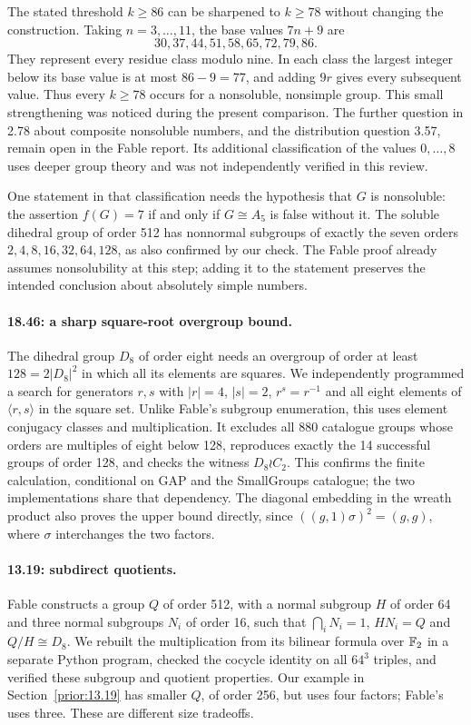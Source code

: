 The stated threshold \(k\ge86\) can be sharpened to \(k\ge78\)
without changing the construction. Taking \(n=3,\ldots,11\), the base
values \(7n+9\) are
\[
30,37,44,51,58,65,72,79,86.
\]
They represent every residue class modulo nine. In each class the
largest integer below its base value is at most \(86-9=77\), and
adding \(9r\) gives every subsequent value. Thus every \(k\ge78\)
occurs for a nonsoluble, nonsimple group. This small strengthening was
noticed during the present comparison. The further question in 2.78
about composite nonsoluble numbers, and the distribution question
3.57, remain open in the Fable report. Its additional classification
of the values \(0,\ldots,8\) uses deeper group theory and was not
independently verified in this review.

One statement in that classification needs the hypothesis that \(G\)
is nonsoluble: the assertion \(f(G)=7\) if and only if \(G\cong A_5\)
is false without it. The soluble dihedral group of order 512 has
nonnormal subgroups of exactly the seven orders
\(2,4,8,16,32,64,128\), as also confirmed by our check.
The Fable proof already assumes nonsolubility at this step; adding
it to the statement preserves the intended conclusion about
absolutely simple numbers.

\paragraph{18.46: a sharp square-root overgroup bound.}
The dihedral group \(D_8\) of order eight needs an overgroup of order
at least \(128=2|D_8|^2\) in which all its elements are squares.
We independently programmed a search for generators \(r,s\) with
\(|r|=4\), \(|s|=2\), \(r^s=r^{-1}\) and all eight elements of
\(\langle r,s\rangle\) in the square set. Unlike Fable's subgroup
enumeration, this uses element conjugacy classes and multiplication.
It excludes all 880 catalogue groups whose orders are
multiples of eight below 128, reproduces exactly the 14 successful
groups of order 128, and checks the witness \(D_8\wr C_2\).
This confirms the finite calculation, conditional on GAP and the
SmallGroups catalogue; the two implementations share that dependency.
The diagonal embedding in the wreath product also proves the upper
bound directly, since \(((g,1)\sigma)^2=(g,g)\), where \(\sigma\)
interchanges the two factors.

\paragraph{13.19: subdirect quotients.}
Fable constructs a group \(Q\) of order 512, with a normal subgroup
\(H\) of order 64 and three normal subgroups \(N_i\) of order 16,
such that \(\bigcap_iN_i=1\), \(HN_i=Q\) and \(Q/H\cong D_8\).
We rebuilt the multiplication from its bilinear formula over \(\mathbb F_2\)
in a separate Python program, checked the cocycle identity on all
\(64^3\) triples, and verified these subgroup and quotient properties.
Our example in Section~\ref{prior:13.19} has smaller \(Q\), of order
256, but uses four factors; Fable's uses three. These are different
size tradeoffs.

